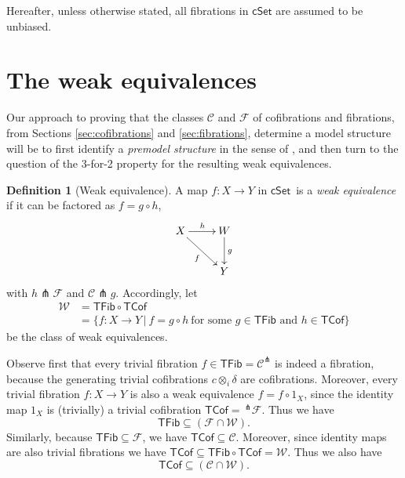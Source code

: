 \documentclass[11pt,reqno]{amsart}
\newcommand{\CC}{\ensuremath{\mathcal{C}}}
\newcommand{\WW}{\ensuremath{\mathcal{W}}}
\newcommand{\FF}{\ensuremath{\mathcal{F}}}
\newcommand{\cSet}{\ensuremath{\mathsf{cSet}}}
\newcommand{\ra}{\ensuremath{\rightarrow}}
\renewcommand{\to}{\ensuremath{\rightarrow}}
\newcommand{\TFib}{\ensuremath{\mathsf{TFib}}}
\newcommand{\TCof}{\ensuremath{\mathsf{TCof}}}
\theoremstyle{remark}
\theoremstyle{definition}
\newtheorem{definition}[theorem]{Definition}
\begin{document}
Hereafter, unless otherwise stated, all fibrations in $\cSet$ are assumed to be  unbiased.

\section{The weak equivalences}\label{sec:weq}

Our approach to proving that the classes $\CC$ and $\FF$ of cofibrations and fibrations, from Sections \ref{sec:cofibrations} and \ref{sec:fibrations}, determine a model structure will be to first identify a \emph{premodel structure} in the sense of \cite{Barton}, and then turn to the question of the 3-for-2 property for the resulting weak equivalences.

\begin{definition}[Weak equivalence]
A map $f: X\ra Y$ in \cSet\ is a \emph{weak equivalence} if it can be factored as $f  = g\circ h$,
\begin{equation*}%
\xymatrix{
X \ar[rd]_{f} \ar[r]^h & W\ar[d]^g\\
& Y
}
\end{equation*}
with $h \pitchfork \FF$ and $\CC\pitchfork g$.  Accordingly, let 
\begin{align*}
\mathcal{W} &= \TFib\circ\TCof \\
	&= \{f: X\ra Y\, |\ f = g\circ h\ \text{for some $g\in\mathsf{TFib}$ and $h\in\mathsf{TCof}$} \}
\end{align*}
 be the class of weak equivalences.
\end{definition}

Observe first that every trivial fibration $f\in\TFib = \mathcal{C}^\pitchfork$ is indeed a fibration, because the generating trivial cofibrations $c\otimes_i\delta$ are cofibrations.  Moreover, every trivial fibration $f : X\to Y$ is also a weak equivalence $f = f\circ 1_X$, since the identity map $1_X$ is (trivially) a trivial cofibration $\TCof =\, ^{\pitchfork}\mathcal{F}$. Thus we have
\[
\mathsf{TFib} \subseteq (\mathcal{F} \cap \mathcal{W}).
\]
%
Similarly, because $\TFib\subseteq\FF$, we have $\TCof\subseteq\CC$.  Moreover, since identity maps are also trivial fibrations we have $\TCof\subseteq \TFib\circ\TCof  =\WW$.  Thus we also have
\[
\mathsf{TCof} \subseteq (\mathcal{C} \cap \mathcal{W}).
\]
\end{document}
